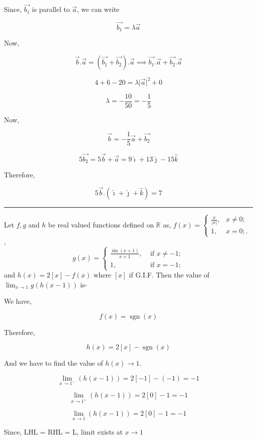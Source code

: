 \documentclass[twocolumn]{article}
\DeclareMathOperator{\sgn}{sgn}
\begin{document}
Since, \(\vec{b_1}\) is parallel to \(\vec{a}\), we can write 

\[
    \vec{b_1} = \lambda \vec{a} 
\]

Now,

\[
    \vec{b}. \vec{a} = (\vec{b_1} + \vec{b_2}).\vec{a} \implies \vec{b_1}.\vec{a} + \vec{b_2}.\vec{a} 
\]

\[
    4 + 6 - 20 = \lambda \vert \vec{a}  \vert^{2} + 0 
\]

\[
    \lambda = -\frac{10}{50} = -\frac{1}{5}
\]

Now, 

\[
    \vec{b} = -\frac{1}{5}\vec{a} + \vec{b_2} 
\]

\[
    5\vec{b_2} = 5\vec{b} + \vec{a} = 9\hat{\imath} + 13\hat{\jmath} - 15\hat{k} 
\]

Therefore,

\[
    \boxed{5\vec{b}.(\hat{\imath} + \hat{\jmath} + \hat{k} ) = 7}
\]

\hrule

\begin{question}
    Let \(f, g\) and \(h\) be real valued functions defined on \(\mathbb{R}\) as, \(f(x) = \begin{cases}
            \frac{x}{\vert x \vert }, & x \ne 0  ;\\
            1, & x= 0; .
        \end{cases}\) ,\\
        \[g(x) = \begin{cases}
            \frac{\sin (x+1)}{x+1}, &\text{ if } x \ne -1 ;\\
            1, &\text{ if } x = -1;
        \end{cases}\] and \(h(x) = 2 [x]- f(x)\) where \([x]\) if G.I.F. Then the value of \(\lim_{x \to 1} g(h(x-1))\) is-   
\end{question}

We have, 

\[
    f(x) = \sgn (x)
\]

Therefore, 

\[
    h(x) = 2[x] - \sgn (x)
\]

And we have to find the value of \(h(x) \to 1\). 

\[
    \lim_{x \to 1^-}(h(x - 1)) = 2[-1] - (- 1) = -1
\]

\[
    \lim_{x \to 1^{+}} (h(x - 1)) = 2[0] - 1 = -1
\]

\[
    \lim_{x \to 1} (h(x-1)) = 2[0] - 1 = -1
\]

Since, LHL = RHL = L, limit exists at \(x \to 1\)
\end{document}
